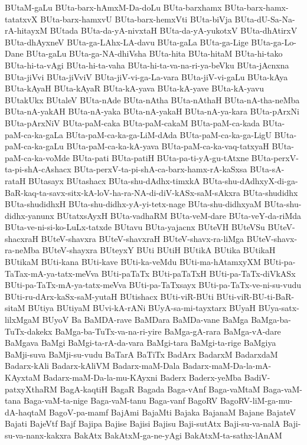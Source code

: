 {BUtaM-gaLu
BUta-barx-hAmxM-Da-doLu
BUta-barxhamx
BUta-barx-hamx-tatatxvX
BUta-barx-hamxvU
BUta-barx-hemxVti
BUta-biVja
BUta-dU-Sa-Na-rA-hitayxM
BUtada
BUta-da-yA-nivxtaH
BUta-da-yA-yukotxV
BUta-dhAtirxV
BUta-dhAyxneV
BUta-ga-LAhx-LA-davu
BUta-gaLa
BUta-ga-Lige
BUta-ga-Lo-Dane
BUta-gaLu
BUta-ga-NA-dhiVsha
BUta-hita
BUta-hitaM
BUta-hi-tako
BUta-hi-ta-vAgi
BUta-hi-ta-vaha
BUta-hi-ta-va-na-ri-ya-beVku
BUta-jAcnxna
BUta-jiVvi
BUta-jiVviV
BUta-jiV-vi-ga-La-vara
BUta-jiV-vi-gaLu
BUta-kAya
BUta-kAyaH
BUta-kAyaR
BUta-kA-yava
BUta-kA-yave
BUta-kA-yavu
BUtakUkx
BUtaleV
BUta-nAde
BUta-nAtha
BUta-nAthaH
BUta-nA-tha-neMba
BUta-nA-yakAH
BUta-nA-yaka
BUta-nA-yakaH
BUta-nA-ya-kara
BUta-pArxNi
BUta-pArxNiV
BUta-paM-caka
BUta-paM-cakaM
BUta-paM-ca-kada
BUta-paM-ca-ka-gaLa
BUta-paM-ca-ka-ga-LiM-dAda
BUta-paM-ca-ka-ga-LigU
BUta-paM-ca-ka-gaLu
BUta-paM-ca-ka-kA-yava
BUta-paM-ca-ka-vaq-tatxyaH
BUta-paM-ca-ka-voMde
BUta-pati
BUta-patiH
BUta-pa-ti-yA-gu-tAtxne
BUta-perxV-ta-pi-shA-cAshacx
BUta-perxV-ta-pi-shA-ca-barx-hamx-rA-kaSxsa
BUta-sA-rataH
BUtasayx
BUtashacx
BUta-shu-dAdhx-timxkA
BUta-shu-dAdhxyX-di-ga-BaR-kaq-ta-savx-sitx-kA-loV-ha-ra-NA-di-diV-kASx-saM-sAkxra
BUta-shudidhx
BUta-shudidhxH
BUta-shu-didhx-yA-yi-tetx-nage
BUta-shu-didhxyaM
BUta-shu-didhx-yanunx
BUtatxsAyxH
BUta-vadhaRM
BUta-veM-dare
BUta-veY-da-riMda
BUta-ve-ni-si-ko-LuLx-tatxde
BUtavu
BUta-yajacnx
BUteVH
BUteVSu
BUteV-shacxraH
BUteV-shavxra
BUteV-shavxraH
BUteV-shavx-ra-liMga
BUteV-shavx-ra-neMba
BUteV-shayxra
BUteyxY
BUti
BUtiH
BUtikA
BUtika
BUtikaH
BUtikaM
BUti-kana
BUti-kave
BUti-ka-veMdu
BUti-ma-hAtamxyXM
BUti-pa-TaTax-mA-ya-tatx-meVva
BUti-paTaTx
BUti-paTaTxH
BUti-pa-TaTx-diVkASx
BUti-pa-TaTx-mA-ya-tatx-meVva
BUti-pa-TaTxsayx
BUti-pa-TaTx-ve-ni-su-vudu
BUti-ru-dArx-kaSx-saM-yutaH
BUtishacx
BUti-viR-BUti
BUti-viR-BU-ti-BaR-sitaM
BUtiya
BUtiyaM
BUvi-kA-rANi
BUyA-sa-mi-tayxtarx
BUyaH
BUya-satx-lilxMgaM
BUyoV
Ba
BaMDA-rave
BaMDara
BaMDa-vane
BaMga
BaMga-ba-TuTx-dakekx
BaMga-ba-TuTx-va-na-ri-yire
BaMga-gA-rara
BaMga-vA-dare
BaMgava
BaMgi
BaMgi-ta-rA-da-vara
BaMgi-tara
BaMgi-ta-rige
BaMgiya
BaMji-suva
BaMji-su-vudu
BaTarA
BaTiTx
BadArx
BadarxM
BadarxdaM
Badarx-kAli
Badarx-kAliVM
Badarx-maM-Dala
Badarx-maM-Da-la-mA-KAyxtaM
Badarx-maM-Da-la-mu-KAyxni
Baderx
Baderx-yeMba
BadiV-patxyXthaRM
BagA-kaqtiH
BagaR
Bagada
Baga-vAnf
Baga-vaMtaM
Baga-vaM-tana
Baga-vaM-ta-nige
Baga-vaM-tanu
Baga-vanf
BagoRV
BagoRV-liM-ga-mu-dA-haqtaM
BagoV-pa-mamf
BajAmi
BajaMti
Bajaka
BajanaM
Bajane
BajateV
Bajati
BajeVtf
Bajf
Bajipa
Bajise
Bajisi
Bajisu
Baji-sutAtx
Baji-su-va-nalA
Baji-su-va-nanx-kakxra
BakAtx
BakAtxM-ga-ne-yAgi
BakAtxM-ta-sathx-lAnAM
}
